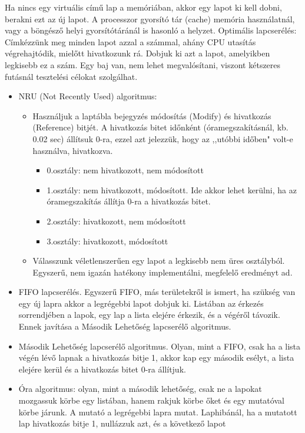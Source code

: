 \documentclass[margin=0px]{article}
\begin{document}
	Ha nincs egy virtuális című lap a memóriában, akkor egy lapot ki kell dobni, berakni ezt az új lapot. A processzor gyorsító tár (cache) memória használatnál, vagy a böngésző helyi gyorsítótáránál is hasonló a helyzet.
	Optimális lapcserélés: Címkézzünk meg minden lapot azzal a számmal, ahány CPU utasítás végrehajtódik, mielőtt hivatkozunk rá. Dobjuk ki azt a lapot, amelyikben legkisebb ez a szám. Egy baj van, nem lehet megvalósítani, viszont kétszeres futásnál tesztelési célokat szolgálhat.
	\begin{itemize}
		\item NRU (Not Recently Used) algoritmus:
		\begin{itemize}
			\item Használjuk a laptábla bejegyzés módosítás (Modify) és hivatkozás (Reference) bitjét. A hivatkozás bitet időnként (óramegszakításnál, kb. 0.02 sec) állítsuk 0-ra, ezzel azt jelezzük, hogy az ,,utóbbi időben" volt-e használva, hivatkozva.
			\begin{itemize}
				\item 0.osztály: nem hivatkozott, nem módosított
				\item 1.osztály: nem hivatkozott, módosított. Ide akkor lehet kerülni, ha az óramegszakítás állítja 0-ra a hivatkozás bitet.
				\item 2.osztály: hivatkozott, nem módosított
				\item 3.osztály: hivatkozott, módosított
			\end{itemize}
			\item Válasszunk véletlenszerűen egy lapot a legkisebb nem üres osztályból. Egyszerű, nem igazán hatékony implementálni, megfelelő eredményt ad.
		\end{itemize}
		\item FIFO lapcserélés. Egyszerű FIFO, más területekről is ismert, ha szükség van egy új lapra akkor a legrégebbi lapot dobjuk ki. Listában az érkezés sorrendjében a lapok, egy lap a lista elejére érkezik, és a végéről távozik. Ennek javítása a Második Lehetőség lapcserélő algoritmus.
		\item Második Lehetőség lapcserélő algoritmus. Olyan, mint a FIFO, csak ha a lista végén lévő lapnak a hivatkozás bitje 1, akkor kap egy második esélyt, a lista elejére kerül és a hivatkozás bitet 0-ra állítjuk.
		\item Óra algoritmus: olyan, mint a második lehetőség, csak ne a lapokat mozgassuk körbe egy
		listában, hanem rakjuk körbe őket és egy mutatóval körbe járunk. A mutató a legrégebbi lapra mutat. Laphibánál, ha a mutatott lap hivatkozás bitje 1, nullázzuk azt, és a következő lapot

\end{itemize}
\end{document}
